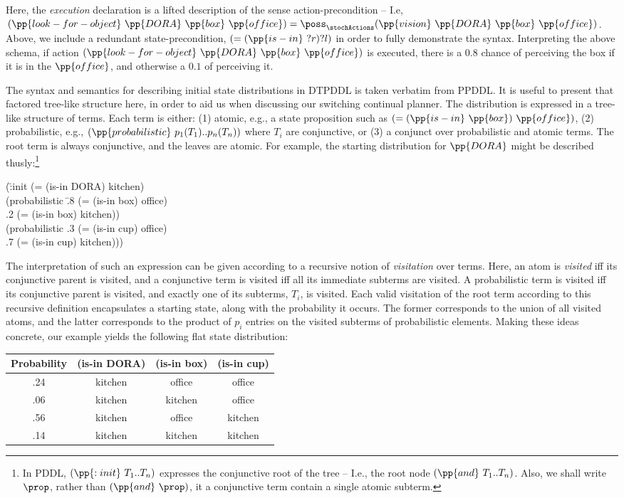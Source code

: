 \noindent Here, the {\em execution} declaration is a lifted description of
the sense action-precondition -- I.e,
$(\pp{look-for-object}~\pp{DORA}~\pp{box}~\pp{office}) =
\poss_\stochActions(\pp{vision}~\pp{DORA}~\pp{box}~\pp{office})$. Above,
we include a redundant state-precondition, $(=(\pp{is-in}~?r)?l)$ in
order to fully demonstrate the syntax. Interpreting the above schema,
if action $(\pp{look-for-object}~\pp{DORA}~\pp{box}~\pp{office})$ is
executed, there is a $0.8$ chance of perceiving the box if it is in
the $\pp{office}$, and otherwise a $0.1$ of perceiving it.

The syntax and semantics for describing initial state distributions in
DTPDDL is taken verbatim from PPDDL. It is useful to present that
factored tree-like structure here, in order to aid us when discussing
our switching continual planner. The distribution is expressed in a
tree-like structure of terms. Each term is either: (1) atomic, e.g., a
state proposition such as $(=(\pp{is-in}~\pp{box})~\pp{office})$,
(2) probabilistic, e.g., $(\pp{probabilistic}~p_1 (T_1) .. p_n (T_n))$
where $T_i$ are conjunctive, or (3) a conjunct over probabilistic and
atomic terms. The root term is always conjunctive, and the leaves are
atomic. For example, the starting distribution for $\pp{DORA}$ might
be described thusly:\footnote{In PDDL, $(\pp{:init}~T_1..T_n)$
expresses the conjunctive root of the tree -- I.e., the root node
$(\pp{and}~T_1..T_n)$. Also, we shall write $\prop$, rather than
$(\pp{and}~\prop)$, it a conjunctive term contain a single atomic
subterm.}

\small
\begin{tabtt}
(\=:init (= (is-in DORA) kitchen) \+ \\
       (probabilistic \=.8 (= (is-in box) office)  \\
		      \>.2 (= (is-in box) kitchen)) \\
       (probabilistic .3 (= (is-in cup) office)  \\
		      \>.7 (= (is-in cup) kitchen))) \\
\end{tabtt}
\normalsize


\noindent The interpretation of such an expression can be given
according to a recursive notion of {\em visitation} over terms. Here,
an atom is {\em visited} iff its conjunctive parent is visited, and a
conjunctive term is visited iff all its immediate subterms are
visited. A probabilistic term is visited iff its conjunctive parent is
visited, and exactly one of its subterms, $T_i$, is visited. Each
valid visitation of the root term according to this recursive
definition encapsulates a starting state, along with the probability
it occurs. The former corresponds to the union of all visited atoms,
and the latter corresponds to the product of $p_i$ entries on the
visited subterms of probabilistic elements. Making these ideas
concrete, our example yields the following flat state distribution:


\small
\begin{tabular}{cccc}
\hline
Probability & (is-in DORA)  & (is-in box)  & (is-in cup) \\
\hline
.24 & kitchen & office & office \\
.06 & kitchen & kitchen & office \\
.56 & kitchen & office & kitchen \\
.14 & kitchen & kitchen & kitchen \\
\hline
\end{tabular}
\normalsize
